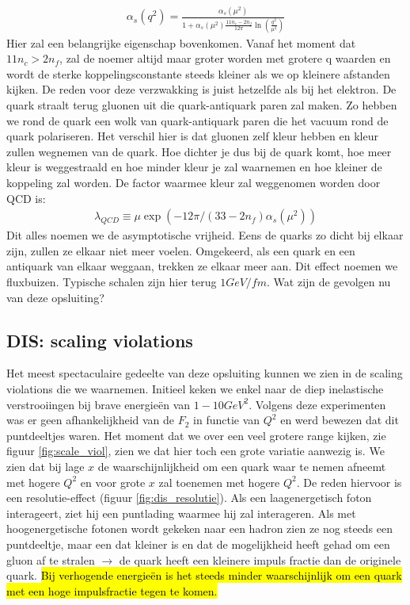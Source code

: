 \documentclass[../main.tex]{subfiles}
\begin{document}
\begin{equation}
    \begin{aligned}
        \label{eq:running_strong}
        \alpha_s(q^2) = \frac{\alpha_s(\mu^2)}{1+\alpha_s(\mu^2) \frac{11n_c-2n_f}{12\pi} \ln\left(\frac{q^2}{\mu^2}\right)} 
    \end{aligned}
\end{equation}
 Hier zal een belangrijke eigenschap bovenkomen. Vanaf het moment dat $11n_c>2n_f$, zal de noemer altijd maar groter worden met grotere q waarden en wordt de sterke koppelingsconstante steeds kleiner als we op kleinere afstanden kijken. De reden voor deze verzwakking is juist hetzelfde als bij het elektron. De quark straalt terug gluonen uit die quark-antiquark paren zal maken. Zo hebben we rond de quark een wolk van quark-antiquark paren die het vacuum rond de quark polariseren. Het verschil hier is dat gluonen zelf kleur hebben en kleur zullen wegnemen van de quark. Hoe dichter je dus bij de quark komt, hoe meer kleur is weggestraald en hoe minder kleur je zal waarnemen en hoe kleiner de koppeling zal worden. De factor waarmee kleur zal weggenomen worden door QCD is:
\begin{equation}
    \begin{aligned}
        \label{eq:kleur_qcd}
        \lambda_{QCD} \equiv \mu \exp(-12\pi/(33-2n_f)\alpha_s(\mu^2))
    \end{aligned}
\end{equation}
Dit alles noemen we de asymptotische vrijheid. Eens de quarks zo dicht bij elkaar zijn, zullen ze elkaar niet meer voelen. Omgekeerd, als een quark en een antiquark van elkaar weggaan, trekken ze elkaar meer aan. Dit effect noemen we fluxbuizen. Typische schalen zijn hier terug $1GeV/fm$. Wat zijn de gevolgen nu van deze opsluiting?

\subsection{DIS: scaling violations}%
\label{sub:dis_scaling_violations}

Het meest spectaculaire gedeelte van deze opsluiting kunnen we zien in de scaling violations die we waarnemen. Initieel keken we enkel naar de diep inelastische verstrooiingen bij brave energieën van $1-10GeV^2$. Volgens deze experimenten was er geen afhankelijkheid van de $F_2$ in functie van $Q^2$ en werd bewezen dat dit puntdeeltjes waren. Het moment dat we over een veel grotere range kijken, zie figuur \ref{fig:scale_viol}, zien we dat hier toch een grote variatie aanwezig is. We zien dat bij lage $x$ de waarschijnlijkheid om een quark waar te nemen afneemt met hogere $Q^2$ en voor grote $x$ zal toenemen met hogere $Q^2$. De reden hiervoor is een resolutie-effect (figuur \ref{fig:dis_resolutie}). Als een laagenergetisch foton interageert, ziet hij een puntlading waarmee hij zal interageren. Als met hoogenergetische fotonen wordt gekeken naar een hadron zien ze nog steeds een puntdeeltje, maar een dat kleiner is en dat de mogelijkheid heeft gehad om een gluon af te stralen $\rightarrow$ de quark heeft een kleinere impuls fractie dan de originele quark. \hl{Bij verhogende energieën is het steeds minder waarschijnlijk om een quark met een hoge impulsfractie tegen te komen.}
\end{document}
